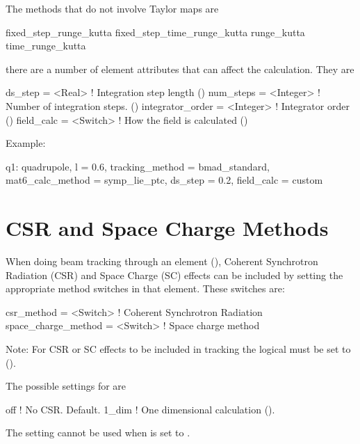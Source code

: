 The methods that do not involve Taylor maps are
\begin{example}
  fixed_step_runge_kutta
  fixed_step_time_runge_kutta
  runge_kutta
  time_runge_kutta
\end{example}

there are a number of element attributes that can affect the calculation. They are
\begin{example}
  ds_step             = <Real>     ! Integration step length ()
  num_steps           = <Integer>  ! Number of integration steps. ()
  integrator_order    = <Integer>  ! Integrator order ()
  field_calc          = <Switch>   ! How the field is calculated ()
\end{example}

Example:
\begin{example}
  q1: quadrupole, l = 0.6, tracking_method = bmad_standard, 
        mat6_calc_method = symp_lie_ptc, ds_step = 0.2, field_calc = custom
\end{example}

\section{CSR and Space Charge Methods}
\label{s:csr.sc.meth}

When doing beam tracking through an element (), Coherent Synchrotron Radiation
(CSR) and Space Charge (SC) effects can be included by setting the appropriate method switches in
that element. These switches are:
\begin{example}
  csr_method          = <Switch>   ! Coherent Synchrotron Radiation 
  space_charge_method = <Switch>   ! Space charge method
\end{example}
Note: For CSR or SC effects to be included in tracking the  logical
 must be set to  ().

The possible settings for  are
\begin{example}
  off             ! No CSR. Default.
  1_dim           ! One dimensional calculation ().
\end{example}
The  setting cannot be used when  is set to  .

